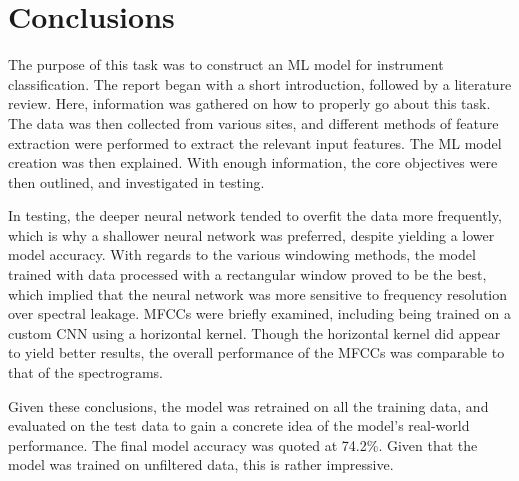 \documentclass[class=report,11pt,crop=false]{standalone}
\begin{document}
\ifstandalone
\tableofcontents
\fi
\section{Conclusions \label{ch:conclusions}}

The purpose of this task was to construct an ML model for instrument classification. The report began with a short introduction, followed by a literature review. Here, information was gathered on how to properly go about this task. The data was then collected from various sites, and different methods of feature extraction were performed to extract the relevant input features. The ML model creation was then explained. With enough information, the core objectives were then outlined, and investigated in testing. 

In testing, the deeper neural network tended to overfit the data more frequently, which is why a shallower neural network was preferred, despite yielding a lower model accuracy. With regards to the various windowing methods, the model trained with data processed with a rectangular window proved to be the best, which implied that the neural network was more sensitive to frequency resolution over spectral leakage. MFCCs were briefly examined, including being trained on a custom CNN using a horizontal kernel. Though the horizontal kernel did appear to yield better results, the overall performance of the MFCCs was comparable to that of the spectrograms.

Given these conclusions, the model was retrained on all the training data, and evaluated on the test data to gain a concrete idea of the model's real-world performance. The final model accuracy was quoted at 74.2\%. Given that the model was trained on unfiltered data, this is rather impressive.

\ifstandalone

\printnoidxglossary[type=\acronymtype,nonumberlist]
\fi
\end{document}
